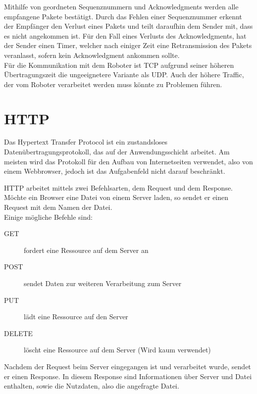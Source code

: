 Mithilfe von geordneten Sequenznummern und Acknowledgments werden alle empfangene Pakete bestätigt. Durch das Fehlen einer Sequenznummer erkennt der Empfänger den Verlust eines Pakets und teilt daraufhin dem Sender mit, dass es nicht angekommen ist. Für den Fall eines Verlusts des Acknowledgments, hat der Sender einen Timer, welcher nach einiger Zeit eine Retransmission des Pakets veranlasst, sofern kein Acknowledgment ankommen sollte. \\

Für die Kommunikation mit dem Roboter ist TCP aufgrund seiner höheren Übertragungszeit die ungeeignetere Variante als UDP. Auch der höhere Traffic, der vom Roboter verarbeitet werden muss könnte zu Problemen führen.


\section{HTTP}
Das Hypertext Transfer Protocol ist ein zustandsloses Datenübertragungsprotokoll, das auf der Anwendungsschicht arbeitet. Am meisten wird das Protokoll für den Aufbau von Internetseiten verwendet, also von einem Webbrowser, jedoch ist das Aufgabenfeld nicht darauf beschränkt.

HTTP arbeitet mittels zwei Befehlsarten, dem Request und dem Response. Möchte ein Browser eine Datei von einem Server laden, so sendet er einen Request mit dem Namen der Datei. \\
Einige mögliche Befehle sind: 
\begin{description}
	\item[GET] fordert eine Ressource auf dem Server an
	\item[POST] sendet Daten zur weiteren Verarbeitung zum Server
	\item[PUT] lädt eine Ressource auf den Server
	\item[DELETE] löscht eine Ressource auf dem Server (Wird kaum verwendet)
\end{description} Nachdem der Request beim Server eingegangen ist und verarbeitet wurde, sendet er einen Response. In diesem Response sind Informationen über Server und Datei enthalten, sowie die Nutzdaten, also die angefragte Datei. 



